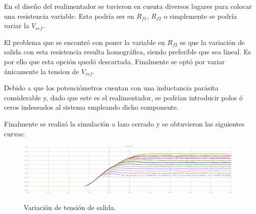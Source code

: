 En el diseño del realimentador se tuvieron en cuenta diversos lugares para colocar una resistencia variable. Esta podría ser en $R_{f1}$, $R_{f2}$ o simplemente se podría variar la $V_{ref}$.

El problema que se encontró con poner la variable en $R_{f2}$ es que la variación de salida con esta resistencia resulta homográfica, siendo preferible que sea lineal. Es por ello que esta opción quedó descartada. Finalmente se optó por variar únicamente la tension de $V_{ref}$.

Debido a que los potenciómetros cuentan con una inductancia parásita considerable y, dado que este es el realimentador, se podrían introducir polos ó ceros indeseados al sistema empleando dicho componente.
 
Finalmente se realizó la simulación a lazo cerrado y se obtuvieron las siguientes curvas:

\begin{figure}[H]
	\centering
	\includegraphics[width=0.9\linewidth]{ImagenesParteIII/Vouts.png}
	\label{fig:vouts_3}
	\caption{Variación de tensión de salida.}
\end{figure}
%